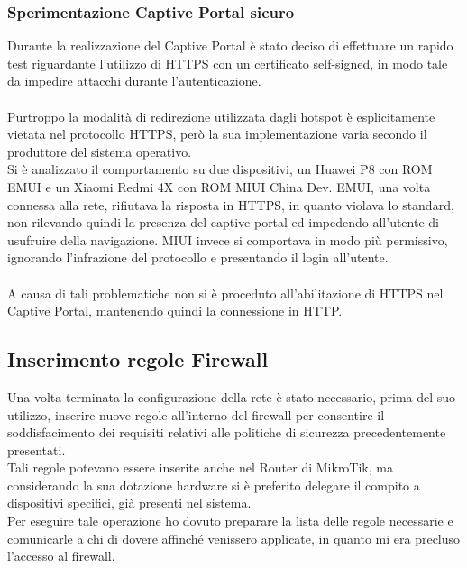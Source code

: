 \documentclass[Realizzazione.tex]{subfiles}
\begin{document}
\subsubsection{Sperimentazione Captive Portal sicuro}
Durante la realizzazione del Captive Portal è stato deciso di effettuare un rapido test riguardante l'utilizzo di HTTPS con un certificato self-signed, in modo tale da impedire attacchi  durante l'autenticazione. \\\\
Purtroppo la modalità di redirezione utilizzata dagli hotspot è esplicitamente vietata nel protocollo HTTPS, però la sua implementazione varia secondo il produttore del sistema operativo. \\
Si è analizzato il comportamento su due dispositivi, un Huawei P8 con ROM EMUI e un Xiaomi Redmi 4X con ROM MIUI China Dev. EMUI, una volta connessa alla rete, rifiutava la risposta in HTTPS, in quanto violava lo standard, non rilevando quindi la presenza del captive portal ed impedendo all'utente di usufruire della navigazione. MIUI invece si comportava in modo più permissivo, ignorando l'infrazione del protocollo e presentando il login all'utente.\\\\
A causa di tali problematiche non si è proceduto all'abilitazione di HTTPS nel Captive Portal, mantenendo quindi la connessione in HTTP.

\subsection{Inserimento regole Firewall} 
Una volta terminata la configurazione della rete è stato necessario, prima del suo utilizzo, inserire nuove regole all'interno del firewall per consentire il soddisfacimento dei requisiti relativi alle politiche di sicurezza precedentemente presentati. \\
Tali regole potevano essere inserite anche nel Router di MikroTik, ma considerando la sua dotazione hardware si è preferito delegare il compito a dispositivi specifici, già presenti nel sistema. \\
Per eseguire tale operazione ho dovuto preparare la lista delle regole necessarie e comunicarle a chi di dovere affinché venissero applicate, in quanto mi era precluso l'accesso al firewall.
\end{document}
